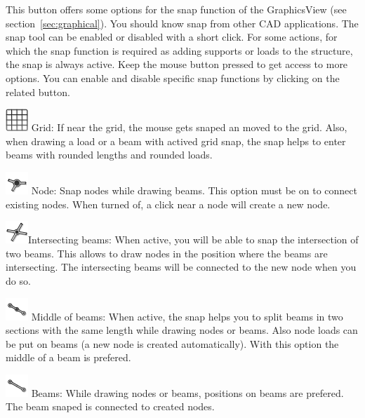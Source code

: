 \documentclass[a4paper,11pt]{report}
\begin{document}
\begin{minipage}[h]{\textwidth-4cm}
This button offers some options for the snap function of the GraphicsView (see section~\ref{sec:graphical}). You should know snap from other CAD applications. The snap tool can be enabled or disabled with a short click. For some actions, for which the snap function is required as adding supports or loads to the structure, the snap is always active. Keep the mouse button pressed to get access to more options. You can enable and disable specific snap functions by clicking on the related button.
\begin{trivlist}
	\item[] \includegraphics[scale = 0.5]{../../icons/grid.png} Grid: If near the grid, the mouse gets snaped an moved to the grid. Also, when drawing a load or a beam with actived grid snap, the snap helps to enter beams with rounded lengths and rounded loads.
	\item[] \includegraphics[scale = 0.5]{../../icons/node.png} Node: Snap nodes while drawing beams. This option must be on to connect existing nodes. When turned of, a click near a node will create a new node.
	\item[] \includegraphics[scale = 0.5]{../../icons/crossing.png}Intersecting beams: When active, you will be able to snap the intersection of two beams. This allows to draw nodes in the position where the beams are intersecting. The intersecting beams will be connected to the new node when you do so.
	\item[] \includegraphics[scale = 0.5]{../../icons/middle.png} Middle of beams: When active, the snap helps you to split beams in two sections with the same length while drawing nodes or beams. Also node loads can be put on beams (a new node is created automatically). With this option the middle of a beam is prefered.
	\item[] \includegraphics[scale = 0.5]{../../icons/beam.png} Beams: While drawing nodes or beams, positions on beams are prefered. The beam snaped is connected to created nodes.

\end{trivlist}
\end{minipage}
\end{document}
